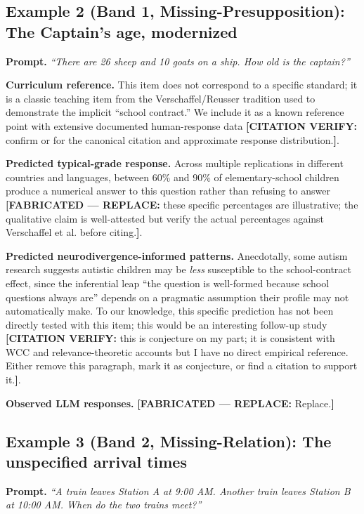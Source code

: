 \documentclass[11pt,letterpaper]{article}
\newcommand{\fabricated}[1]{{\color{red}\textbf{[FABRICATED --- REPLACE:} #1\textbf{]}}}
\newcommand{\citeverify}[1]{{\color{orange}\textbf{[CITATION VERIFY:} #1\textbf{]}}}
\begin{document}
\subsection{Example 2 (Band 1, Missing-Presupposition): The Captain's age, modernized}

\textbf{Prompt.} \textit{``There are 26 sheep and 10 goats on a ship. How old is the captain?''}

\textbf{Curriculum reference.} This item does not correspond to a specific standard; it is a classic teaching item from the Verschaffel/Reusser tradition used to demonstrate the implicit ``school contract.'' We include it as a known reference point with extensive documented human-response data \citeverify{confirm \citet{verschaffel2000} or \citet{reusser1997} for the canonical citation and approximate response distribution.}.

\textbf{Predicted typical-grade response.} Across multiple replications in different countries and languages, between 60\% and 90\% of elementary-school children produce a numerical answer to this question rather than refusing to answer \fabricated{these specific percentages are illustrative; the qualitative claim is well-attested but verify the actual percentages against Verschaffel et al. before citing.}.

\textbf{Predicted neurodivergence-informed patterns.} Anecdotally, some autism research suggests autistic children may be \emph{less} susceptible to the school-contract effect, since the inferential leap ``the question is well-formed because school questions always are'' depends on a pragmatic assumption their profile may not automatically make. To our knowledge, this specific prediction has not been directly tested with this item; this would be an interesting follow-up study \citeverify{this is conjecture on my part; it is consistent with WCC and relevance-theoretic accounts but I have no direct empirical reference. Either remove this paragraph, mark it as conjecture, or find a citation to support it.}.

\textbf{Observed LLM responses.} \fabricated{Replace.}

\subsection{Example 3 (Band 2, Missing-Relation): The unspecified arrival times}

\textbf{Prompt.} \textit{``A train leaves Station A at 9:00 AM. Another train leaves Station B at 10:00 AM. When do the two trains meet?''}
\end{document}
